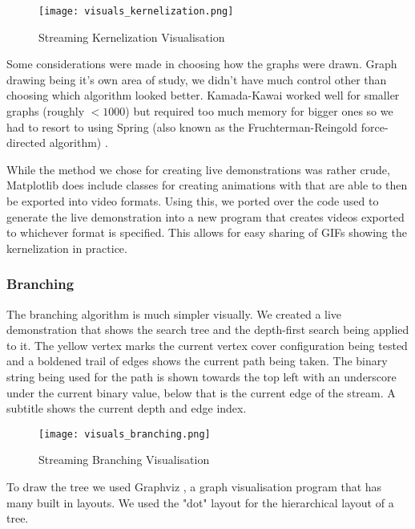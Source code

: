 \begin{figure}[htb]
    \centering
    \texttt{[image: visuals\_kernelization.png]}
    \caption{Streaming Kernelization Visualisation}
    \label{fig:kernelization_visualisation}
\end{figure}

Some considerations were made in choosing how the graphs were drawn. Graph
drawing being it's own area of study, we didn't have much control other than
choosing which algorithm looked better. Kamada-Kawai \cite{kamada1989drawing}
worked well for smaller graphs (roughly $< 1000$) but required too much memory
for bigger ones so we had to resort to using Spring (also known as the
Fruchterman-Reingold force-directed algorithm) \cite{fruchterman1991graph}.

While the method we chose for creating live demonstrations was rather crude,
Matplotlib does include classes for creating animations with that are able to
then be exported into video formats. Using this, we ported over the code used
to generate the live demonstration into a new program that creates videos
exported to whichever format is specified. This allows for easy sharing of GIFs
showing the kernelization in practice.

\subsubsection{Branching}

The branching algorithm is much simpler visually. We created a live
demonstration that shows the search tree and the depth-first search being
applied to it. The yellow vertex marks the current vertex cover configuration
being tested and a boldened trail of edges shows the current path being taken.
The binary string being used for the path is shown towards the top left with an
underscore under the current binary value, below that is the current edge of
the stream. A subtitle shows the current depth and edge index.

\begin{figure}[htb]
    \centering
    \texttt{[image: visuals\_branching.png]}
    \caption{Streaming Branching Visualisation}
    \label{fig:branching_visualisation}
\end{figure}

To draw the tree we used Graphviz \cite{ellson2003graphviz}, a graph
visualisation program that has many built in layouts. We used the "dot" layout
for the hierarchical layout of a tree.

